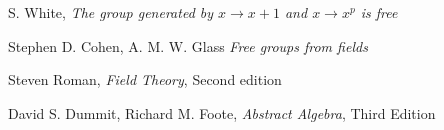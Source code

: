 \begin{thebibliography}{99}

  S. White,
  \textit{The group generated by $x \rightarrow x + 1$ and $x \rightarrow x^p$
  is free}

  Stephen D. Cohen, A. M. W. Glass
  \textit{Free groups from fields}

  Steven Roman,
  \textit{Field Theory},
  Second edition

  David S. Dummit,
  Richard M. Foote,
  \textit{Abstract Algebra},
  Third Edition
\end{thebibliography}
